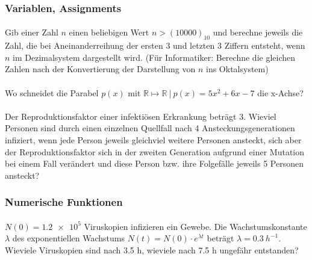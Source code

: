 \documentclass[paper=A4, pagesize, DIV=calc, smallheadings,
fontsize=12pt, expansion=false]{scrreprt}
\begin{document}
\subsubsection*{Variablen, Assignments}
\paragraph{}
Gib einer Zahl $n$ einen beliebigen Wert $n > (10000)_{10}$ und berechne jeweils die Zahl, die bei Aneinanderreihung 
der 
ersten 3 und letzten 3 Ziffern entsteht, wenn $n$ im Dezimalsystem dargestellt wird. (Für Informatiker: Berechne die 
gleichen Zahlen nach der Konvertierung der Darstellung von $n$ ins Oktalsystem)
\paragraph{}
Wo schneidet die Parabel $p(x)$  mit $\mathbb{R}\mapsto \mathbb{R}~ |~  p(x)=5x^2 + 6x - 7 $ die x-Achse?
\paragraph{}
Der Reproduktionsfaktor einer infektiösen Erkrankung beträgt 3. Wieviel Personen sind durch einen einzelnen Quellfall 
nach 4 Ansteckungsgenerationen infiziert, wenn jede Person jeweils gleichviel weitere Personen ansteckt, sich aber der 
Reproduktionsfaktor sich in der zweiten Generation aufgrund einer Mutation bei einem Fall verändert und diese Person 
bzw. ihre Folgefälle jeweils 5 Personen ansteckt?

\subsubsection*{Numerische Funktionen}

\paragraph{}
$N(0) = \num{1.2e5}$ Viruskopien infizieren ein Gewebe. Die Wachstumskonstante $\lambda$ des exponentiellen Wachstums
$ N(t) = N(0) \cdot e^{\lambda t}$ beträgt $\lambda = \SI{0.3}{h^{-1}}$. Wieviele Viruskopien sind nach 3.5 h, 
wieviele nach 7.5 h ungefähr entstanden?
\end{document}
